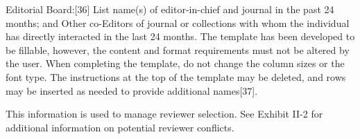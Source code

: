 {Editorial Board:[36] List name(s) of editor-in-chief and journal in the past 24 months; and
Other co-Editors of journal or collections with whom the individual has directly interacted in the last 24 months.
The template has been developed to be fillable, however, the content and format requirements must not be altered by the user. When completing the template, do not change the column sizes or the font type. The instructions at the top of the template may be deleted, and rows may be inserted as needed to provide additional names[37].

This information is used to manage reviewer selection. See Exhibit II-2 for additional information on potential reviewer conflicts.


}

